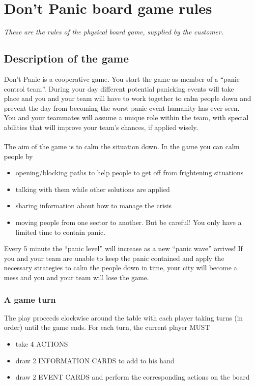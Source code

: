 \chapter{Don't Panic board game rules}
\label{appendix:B}
%
\emph{These are the rules of the physical board game, supplied by the customer.}
%
%
\section*{Description of the game}
Don’t Panic is a cooperative game. You start the game as member of a “panic control team”. During your day different potential panicking events will take place and you and your team will have to work together to calm people down and prevent the day from becoming the worst panic event humanity has ever seen. You and your teammates will assume a unique role within the team, with special abilities that will improve your team’s chances, if applied wisely.\\
\\
The aim of the game is to calm the situation down. In the game you can calm people by
\begin{itemize}
	\item opening/blocking paths to help people to get off from frightening situations
	\item talking with them while other solutions are applied
	\item sharing information about how to manage the crisis
	\item moving people from one sector to another. But be careful! You only have a limited time to contain panic.
\end{itemize}
Every 5 minute the “panic level” will increase as a new “panic wave” arrives! If you and your team are unable to keep the panic contained and apply the necessary strategies to calm the people down in time, your city will become a mess and you and your team will lose the game.\\
%
%
\subsection*{A game turn}
The play proceeds clockwise around the table with each player taking turns (in order) until the game ends. For each turn, the current player MUST
\begin{itemize}
	\item take 	4 ACTIONS
	\item draw 	2 INFORMATION CARDS to add to his hand	
	\item draw 	2 EVENT CARDS and perform the corresponding actions on the board
\end{itemize}
%
%
